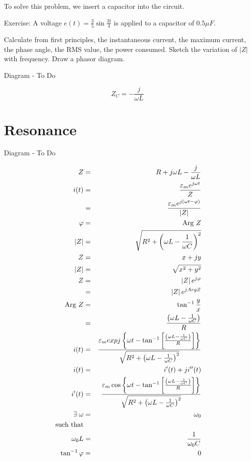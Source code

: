 \documentclass[a4paper,12pt]{article}
\begin{document}
To solve this problem, we insert a capacitor into the circuit.


Exercise: A voltage $e(t) = \frac{3}{5} \sin{\frac{3t}{4}}$ is applied
to a capacitor of $0.5 \mu F$.

Calculate from first principles, the instantaneous current, the maximum
current, the phase angle, the RMS value, the power consumed. Sketch the
variation of $\left| Z \right|$ with frequency. Draw a phasor diagram.

Diagram - To Do

\[ Z_{C} = - \frac{j}{\omega L} \]


\section{Resonance}

\begin{table}[hbtp]

Diagram - To Do

\end{table}

\begin{eqnarray*}
Z & = & R + j \omega L - \frac{j}{\omega L} \\
i(t) & = & \frac{\varepsilon_{m} e^{j \omega t} }{Z} \\
	  & = & \frac{\varepsilon_{m} e^{j(\omega t - \varphi)}}{\left| Z
	  \right|} \\
\varphi & = & \mbox{Arg } Z \\
\left| Z \right| & = & \sqrt{R^{2} + \left(\omega L - \frac{1}{\omega
C}\right)^{2}} \\
Z & = & x + j y \\
\left| Z \right| & = &\sqrt{x^{2} + y^{2}} \\
Z & = & \left| Z \right| e^{j \varphi} \\
  & = & \left| Z \right| e^{j Arg  Z} \\
\mbox{Arg } Z & = & \tan^{-1}{\frac{y}{x}} \\
				  & = & \frac{\left( \omega L - \frac{1}{\omega C}
				  \right)}{R} \\
i(t)	& = & \frac{\varepsilon_{m} exp j \left\{ \omega t -
\tan^{-1}{\left[ \frac{\left(\omega L - \frac{1}{\omega C}\right)}{R}
\right]}\right\}}{\sqrt{R^{2} + \left(\omega L -  \frac{1}{\omega
C}\right)^{2}}} \\
i(t)	& = & i'(t) + j i''(t) \\
i'(t)  & = & \frac{\varepsilon_{m} \cos{\left\{ \omega t -
\tan^{-1}{\left[ \frac{\left(\omega L - \frac{1}{\omega C}\right)}{R}
\right]}\right\}}}{\sqrt{R^{2} + \left(\omega L -  \frac{1}{\omega
C}\right)^{2}}} \\
\exists \hspace{1mm} \omega & = & \omega_{0} \\
\mbox{ such that} & & \\
\omega_{0} L & = & \frac{1}{\omega_{0} C} \\
\tan^{-1}{\varphi} & = & 0
\end{eqnarray*}
\end{document}
